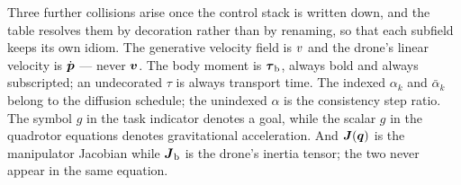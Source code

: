 Three further collisions arise once the control stack is written down, and the table resolves them
by decoration rather than by renaming, so that each subfield keeps its own idiom. The generative
velocity field is $v$ and the drone's linear velocity is $\dot{\boldsymbol{p}}$ --- never $\boldsymbol{v}$.
The body moment is $\boldsymbol{\tau}_{\textrm{b}}$, always bold and always subscripted; an undecorated $\tau$
is always transport time. The indexed $\alpha_k$ and $\bar{\alpha}_k$ belong to the diffusion
schedule; the unindexed $\alpha$ is the consistency step ratio. The symbol $g$ in the task indicator
denotes a goal, while the scalar $g$ in the quadrotor equations denotes gravitational acceleration.
And $\boldsymbol{J}(\boldsymbol{q})$ is the manipulator Jacobian while
$\boldsymbol{J}_{\textrm{b}}$ is the drone's inertia tensor; the two never appear in the same equation.

